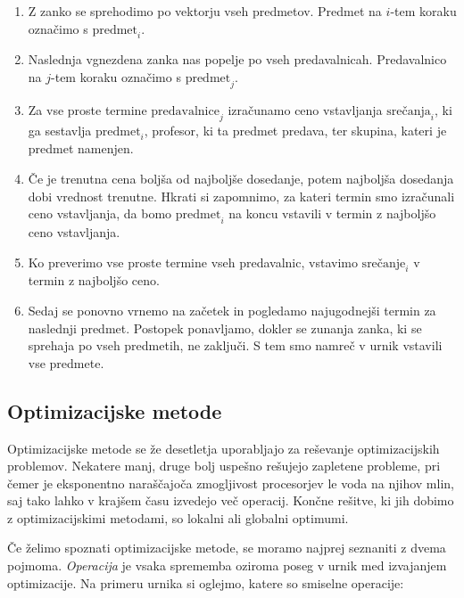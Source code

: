 \documentclass[a4paper,10pt]{article}
\begin{document}
   \begin{enumerate}
      \item Z zanko se sprehodimo po vektorju vseh predmetov. Predmet na \(i\)-tem koraku
      označimo s \(\text{predmet}_i\).
   
      \item Naslednja vgnezdena zanka nas popelje po vseh predavalnicah. Predavalnico na
      \(j\)-tem koraku označimo s \(\text{predmet}_j\).
   
      \item Za vse proste termine \(\text{predavalnice}_j\) izračunamo ceno vstavljanja
      \(\text{srečanja}_i\), ki ga sestavlja \(\text{predmet}_i\), profesor, ki ta predmet predava,
      ter skupina, kateri je predmet namenjen.
   
      \item Če je trenutna cena boljša od najboljše dosedanje, potem najboljša dosedanja
      dobi vrednost trenutne. Hkrati si zapomnimo, za kateri termin smo izračunali ceno
      vstavljanja, da bomo \(\text{predmet}_i\) na koncu vstavili v termin z najboljšo
      ceno vstavljanja.
   
      \item Ko preverimo vse proste termine vseh predavalnic, vstavimo \(\text{srečanje}_i\)
      v termin z najboljšo ceno.
   
      \item Sedaj se ponovno vrnemo na začetek in pogledamo najugodnejši termin za naslednji
      predmet. Postopek ponavljamo, dokler se zunanja zanka, ki se sprehaja po vseh predmetih,
      ne zaključi. S tem smo namreč v urnik vstavili vse predmete.
   \end{enumerate}

\subsection{Optimizacijske metode}

Optimizacijske metode se že desetletja uporabljajo za reševanje optimizacijskih problemov.
Nekatere manj, druge bolj uspešno rešujejo zapletene probleme, pri čemer je eksponentno
naraščajoča zmogljivost procesorjev le voda na njihov mlin, saj tako lahko v krajšem
času izvedejo več operacij. Končne rešitve, ki jih dobimo z optimizacijskimi metodami,
so lokalni ali globalni optimumi.

Če želimo spoznati optimizacijske metode, se moramo najprej seznaniti z dvema pojmoma.
\emph{Operacija} je vsaka sprememba oziroma poseg v urnik med izvajanjem optimizacije.
Na primeru urnika si oglejmo, katere so smiselne operacije:
\end{document}
